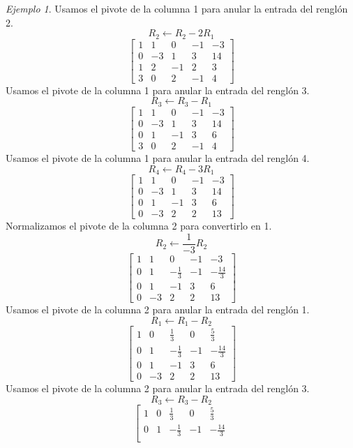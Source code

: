 \documentclass[12pt]{article}
\theoremstyle{remark}
\newtheorem{Ejem}[definicion]{Ejemplo}
\begin{document}
\begin{Ejem}
Usamos el pivote de la columna 1 para anular la entrada del renglón 2.
\[
R_{2}\leftarrow R_{2}-2R_{1}
\]
\[
\left[\begin{array}{cccc|c}
1 & 1 & 0 & -1 & -3\\
0 & -3 & 1 & 3 & 14\\
1 & 2 & -1 & 2 & 3\\
3 & 0 & 2 & -1 & 4
\end{array}\right]
\]
 Usamos el pivote de la columna 1 para anular la entrada del renglón 3.
\[
R_{3}\leftarrow R_{3}-R_{1}
\]
\[
\left[\begin{array}{cccc|c}
1 & 1 & 0 & -1 & -3\\
0 & -3 & 1 & 3 & 14\\
0 & 1 & -1 & 3 & 6\\
3 & 0 & 2 & -1 & 4
\end{array}\right]
\]
 Usamos el pivote de la columna 1 para anular la entrada del renglón 4.
\[
R_{4}\leftarrow R_{4}-3R_{1}
\]
\[
\left[\begin{array}{cccc|c}
1 & 1 & 0 & -1 & -3\\
0 & -3 & 1 & 3 & 14\\
0 & 1 & -1 & 3 & 6\\
0 & -3 & 2 & 2 & 13
\end{array}\right]
\]
Normalizamos el pivote de la columna 2 para convertirlo en 1.
\[
R_{2}\leftarrow \frac{1}{-3}R_{2}
\]
\[
\left[\begin{array}{cccc|c}
1 & 1 & 0 & -1 & -3\\
0 & 1 & - \frac{1}{3} & -1 & - \frac{14}{3}\\
0 & 1 & -1 & 3 & 6\\
0 & -3 & 2 & 2 & 13
\end{array}\right]
\]
Usamos el pivote de la columna 2 para anular la entrada del renglón 1.
\[
R_{1}\leftarrow R_{1}-R_{2}
\]
\[
\left[\begin{array}{cccc|c}
1 & 0 & \frac{1}{3} & 0 & \frac{5}{3}\\
0 & 1 & - \frac{1}{3} & -1 & - \frac{14}{3}\\
0 & 1 & -1 & 3 & 6\\
0 & -3 & 2 & 2 & 13
\end{array}\right]
\]
 Usamos el pivote de la columna 2 para anular la entrada del renglón 3.
\[
R_{3}\leftarrow R_{3}-R_{2}
\]
\[
\left[\begin{array}{cccc|c}
1 & 0 & \frac{1}{3} & 0 & \frac{5}{3}\\
0 & 1 & - \frac{1}{3} & -1 & - \frac{14}{3}\\

\end{array}\]
\end{Ejem}
\end{document}
